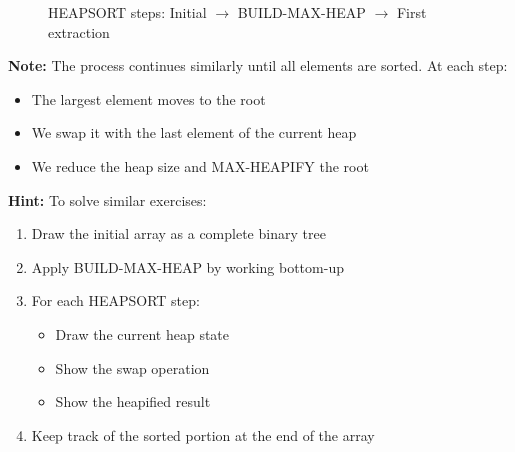 \begin{figure}[H]
    \centering
    \caption*{\footnotesize HEAPSORT steps: Initial $\rightarrow$ BUILD-MAX-HEAP $\rightarrow$ First extraction}
\end{figure}

\textbf{Note:} The process continues similarly until all elements are sorted. At each step:
\begin{itemize}
    \item The largest element moves to the root
    \item We swap it with the last element of the current heap
    \item We reduce the heap size and MAX-HEAPIFY the root
\end{itemize}

\textbf{Hint:} To solve similar exercises:
\begin{enumerate}
    \item Draw the initial array as a complete binary tree
    \item Apply BUILD-MAX-HEAP by working bottom-up
    \item For each HEAPSORT step:
       \begin{itemize}
          \item Draw the current heap state
          \item Show the swap operation
          \item Show the heapified result
       \end{itemize}
    \item Keep track of the sorted portion at the end of the array
\end{enumerate}

